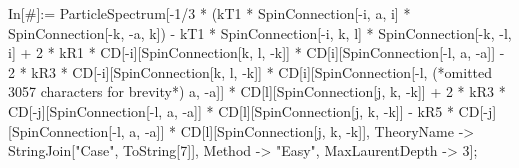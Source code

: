 In[#]:= ParticleSpectrum[-1/3 * (kT1 * SpinConnection[-i, a, i] * SpinConnection[-k, -a, k]) - kT1 * SpinConnection[-i, k, l] * SpinConnection[-k, -l, i] + 2 * kR1 * CD[-i][SpinConnection[k, l, -k]] * CD[i][SpinConnection[-l, a, -a]] - 2 * kR3 * CD[-i][SpinConnection[k, l, -k]] * CD[i][SpinConnection[-l, (*omitted 3057 characters for brevity*) a, -a]] * CD[l][SpinConnection[j, k, -k]] + 2 * kR3 * CD[-j][SpinConnection[-l, a, -a]] * CD[l][SpinConnection[j, k, -k]] - kR5 * CD[-j][SpinConnection[-l, a, -a]] * CD[l][SpinConnection[j, k, -k]], TheoryName -> StringJoin["Case", ToString[7]], Method -> "Easy", MaxLaurentDepth -> 3];